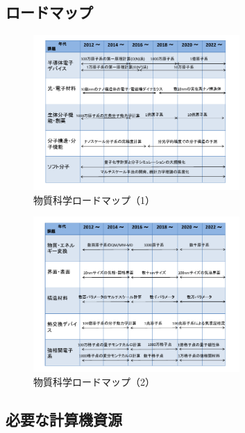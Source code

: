 \subsection{ロードマップ}
\begin{figure}[H]
  \centering
  \includegraphics[width=0.7\textwidth]{figs/2-2_rm_1.pdf}
  \caption{物質科学ロードマップ（1）}
  \label{fig:roadmap_2-2_1}
\end{figure}
\begin{figure}[H]
  \centering
  \includegraphics[width=0.7\textwidth]{figs/2-2_rm_2.pdf}
  \caption{物質科学ロードマップ（2）}
  \label{fig:roadmap_2-2_2}
\end{figure}

\subsection{必要な計算機資源}


\nocite{*}


